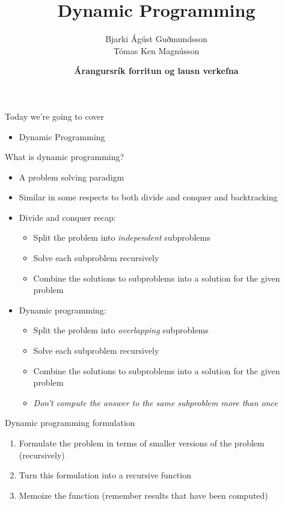 \documentclass[10pt]{beamer}
\title{Dynamic Programming}
\author{Bjarki Ágúst Guðmundsson\\ Tómas Ken Magnússon}
\institute{\href{http://ru.is/td}{School of Computer Science} \\[2pt] \href{http://ru.is}{Reykjavík University}}
\date{\textbf{Árangursrík forritun og lausn verkefna}}
\newcommand{\bi}{\begin{itemize}}
\newcommand{\ei}{\end{itemize}}
\newcommand{\be}{\begin{enumerate}}
\newcommand{\ee}{\end{enumerate}}
\begin{document}
\maketitle


\begin{frame}{Today we're going to cover}
    \vspace{40pt}
    \bi
        \item Dynamic Programming
    \ei
\end{frame}

\begin{frame}{What is dynamic programming?}
    \bi
        \item A problem solving paradigm
        \item Similar in some respects to both divide and conquer and backtracking
        \vspace{5pt}
        \item Divide and conquer recap:
            \bi
                \item Split the problem into \textit{independent} subproblems
                \item Solve each subproblem recursively
                \item Combine the solutions to subproblems into a solution for the given problem
            \ei
        \vspace{5pt}
        \item Dynamic programming:
            \bi
                \item Split the problem into \textit{overlapping} subproblems
                \item Solve each subproblem recursively
                \item Combine the solutions to subproblems into a solution for the given problem
                \item \textit{Don't compute the answer to the same subproblem more than once}
            \ei
    \ei
\end{frame}

\begin{frame}[fragile]{Dynamic programming formulation}
    \vspace{30pt}
    \be
        \item Formulate the problem in terms of smaller versions of the problem (recursively)
        \item Turn this formulation into a recursive function
        \item Memoize the function (remember results that have been computed)
    \ee
\end{frame}
\end{document}
